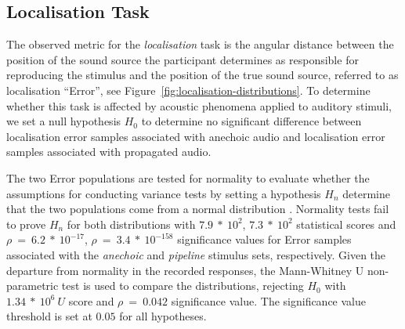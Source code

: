\subsection{Localisation Task}
\label{sec:localisation-results}
The observed metric for the \emph{localisation} task is the angular distance between the position of the sound source the participant determines as responsible for reproducing the stimulus and the position of the true sound source, referred to as localisation ``Error'', see Figure~\ref{fig:localisation-distributions}. To determine whether this task is affected by acoustic phenomena applied to auditory stimuli, we set a null hypothesis $H_0$ to determine no significant difference between localisation error samples associated with anechoic audio and localisation error samples associated with propagated audio. \par
The two Error populations are tested for normality to evaluate whether the assumptions for conducting variance tests by setting a hypothesis $H_n$ determine that the two populations come from a normal distribution \citep{pearson1977tests}. Normality tests fail to prove $H_n$ for both distributions with $7.9\ *\ 10^2$, $7.3\ *\ 10^2$ statistical scores and $\rho\ =\ 6.2\ *\ 10^{-17}$, $\rho\ =\ 3.4\ *\ 10^{-158}$ significance values for Error samples associated with the \emph{anechoic} and \emph{pipeline} stimulus sets, respectively. Given the departure from normality in the recorded responses, the Mann-Whitney U non-parametric test is used to compare the distributions, rejecting $H_0$ with $1.34\ *\ 10^6\ U$ score and $\rho\ =\ 0.042$ significance value. The significance value threshold is set at $0.05$ for all hypotheses. \par

